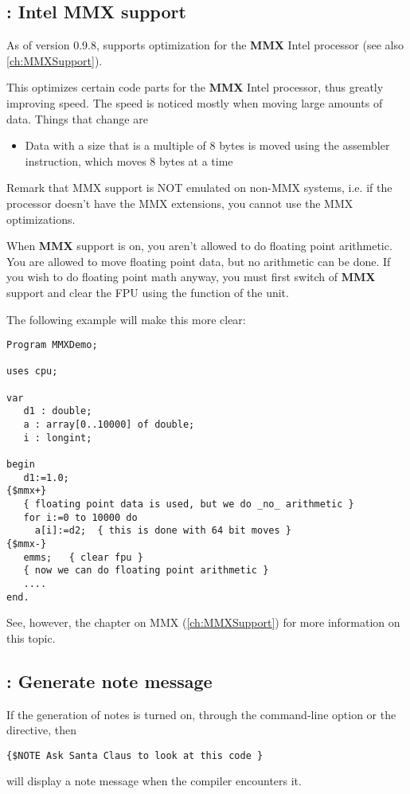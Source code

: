 \documentclass{report}
\begin{document}
\subsection{ : Intel MMX support}
As of version 0.9.8, \fpc supports optimization for the \textbf{MMX} Intel
processor (see also \ref{ch:MMXSupport}).

This optimizes certain code parts for the \textbf{MMX} Intel
processor, thus greatly improving speed. The speed is noticed mostly when
moving large amounts of data. Things that change are
\begin{itemize}
\item Data with a size that is a multiple of 8 bytes is moved using the
 assembler instruction, which moves 8 bytes at a time
\end{itemize}
Remark that MMX support is NOT emulated on non-MMX systems, i.e. if
the processor doesn't have the MMX extensions, you cannot use the MMX
optimizations.

When \textbf{MMX} support is on, you aren't allowed to do floating point
arithmetic. You are allowed to move floating point data, but no arithmetic
can be done. If you wish to do floating point math anyway, you must first
switch of \textbf{MMX} support and clear the FPU using the 
function of the  unit.

The following example will make this more clear:
\begin{verbatim}
Program MMXDemo;

uses cpu;

var
   d1 : double;
   a : array[0..10000] of double;
   i : longint;

begin
   d1:=1.0;
{$mmx+}
   { floating point data is used, but we do _no_ arithmetic }
   for i:=0 to 10000 do
     a[i]:=d2;  { this is done with 64 bit moves }
{$mmx-}
   emms;   { clear fpu }
   { now we can do floating point arithmetic }
   ....
end.
\end{verbatim}
See, however, the chapter on MMX (\ref{ch:MMXSupport}) for more information
on this topic.

\subsection{ : Generate note message}

If the generation of notes is turned on, through the  command-line
option or the  directive, then
\begin{verbatim}
{$NOTE Ask Santa Claus to look at this code }
\end{verbatim}
will display a note message when the compiler encounters it.
\end{document}
